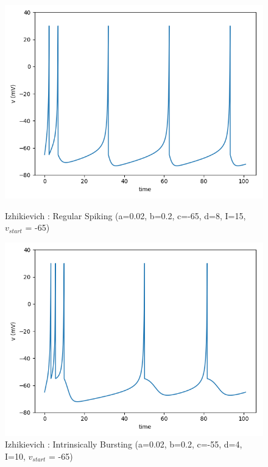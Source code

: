 \documentclass[12pt]{scrartcl}
\begin{document}
\begin{figure}[!h]
\begin{minipage}[l]{.48\linewidth}
\centering
\includegraphics[scale=0.5]{imgs/izRS.png}
\caption{Izhikievich : Regular Spiking (a=0.02, b=0.2, c=-65, d=8, I=15, $v_{start}$ = -65)}
\label{izRS}
\end{minipage}\hfill
\begin{minipage}[l]{.48\linewidth}
\centering
\includegraphics[scale=0.5]{imgs/izIB.png}
\caption{Izhikievich : Intrinsically Bursting (a=0.02, b=0.2, c=-55, d=4, I=10, $v_{start}$ = -65)}
\label{izIB}
\end{minipage}\hfill
\end{figure}
\end{document}
